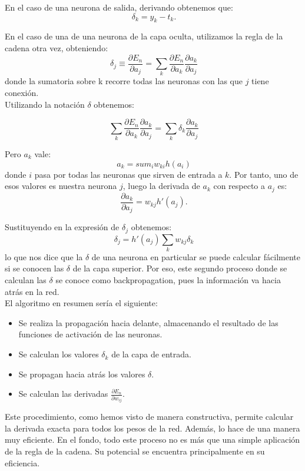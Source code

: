 En el caso de una neurona de salida, derivando obtenemos que:
\[
\ \delta_k = y_k - t_k.
\]

En el caso de una de una neurona de la capa oculta, utilizamos la regla de la cadena otra vez, obteniendo:
\[
\ \delta_j \equiv \frac{\partial E_n}{\partial a_j} = \sum_k \frac{\partial E_n}{\partial a_k} \frac{\partial a_k}{\partial a_j}
\]
donde la sumatoria sobre k recorre todas las neuronas con las que $j$ tiene conexión.\\

Utilizando la notación $\delta$ obtenemos:

\[
\ \sum_k \frac{\partial E_n}{\partial a_k} \frac{\partial a_k}{\partial a_j} = \sum_k \delta_k \frac{\partial a_k}{\partial a_j}
\]

Pero $a_k$ vale:
\[
\ a_k = sum_i w_{ki}h(a_i)
\]
donde $i$ pasa por todas las neuronas que sirven de entrada a $k$. Por tanto, uno de esos valores es nuestra neurona $j$, luego la derivada de $a_k$ con respecto a $a_j$ es:
\[
\ \frac{\partial a_k}{\partial a_j} = w_{kj} h'(a_j).
\]

Sustituyendo en la expresión de $\delta_j$ obtenemos:
\[
\ \delta_j = h'(a_j) \sum_k w_{kj} \delta_k
\]
lo que nos dice que la $\delta$ de una neurona en particular se puede calcular fácilmente si se conocen las $\delta$ de la capa superior. Por eso, este segundo proceso donde se calculan las $\delta$ se conoce como backpropagation, pues la información va hacia atrás en la red.\\

El algoritmo en resumen sería el siguiente:
\begin{itemize}
\item Se realiza la propagación hacia delante, almacenando el resultado de las funciones de activación de las neuronas.
\item Se calculan los valores $\delta_k$ de la capa de entrada.
\item Se propagan hacia atrás los valores $\delta$.
\item Se calculan las derivadas $\frac{\partial E_n}{\partial w_{ij}}$.
\end{itemize}
 
Este procedimiento, como hemos visto de manera constructiva, permite calcular la derivada exacta para todos los pesos de la red. Además, lo hace de una manera muy eficiente. En el fondo, todo este proceso no es más que una simple aplicación de la regla de la cadena. Su potencial se encuentra principalmente en su eficiencia.\\

